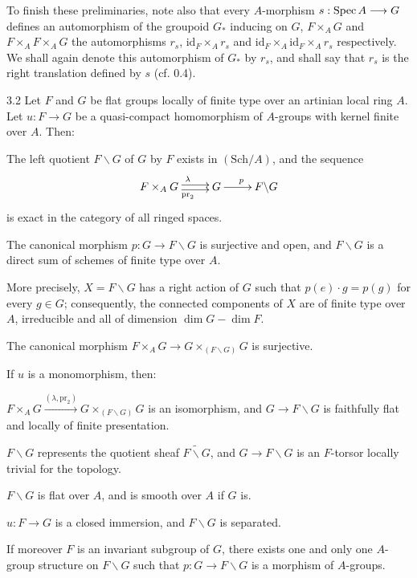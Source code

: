 To finish these preliminaries, note also that every $A$-morphism $s:\operatorname{Spec} A\longrightarrow G$ defines an automorphism of the groupoid $G_*$ inducing on $G$, $F\times_AG$ and $F\times_AF\times_AG$ the automorphisms $r_s$, $\mathrm{id}_F\times_Ar_s$ and $\mathrm{id}_F\times_A\mathrm{id}_F\times_Ar_s$ respectively. We shall again denote this automorphism of $G_*$ by $r_s$, and shall say that $r_s$ is the right translation defined by $s$ (cf. 0.4).
\begin{theorem}{3.2}\label{VIA.3.2}
Let $F$ and $G$ be flat groups locally of finite type over an artinian local ring $A$. Let $u:F\to G$ be a quasi-compact homomorphism of $A$-groups with kernel finite over $A$. Then:
\begin{enumeratei}
\item The left quotient $F\backslash G$ of $G$ by $F$ exists in $(\mathrm{Sch}/A)$, and the sequence
\[
\xymatrix{F\times_AG\ar@<.5ex>[r]^\lambda\ar@<-.5ex>[r]_{\mathrm{pr}_2}&G\ar[r]^p&F\backslash G}
\]
is exact in the category of all ringed spaces.
\item The canonical morphism $p:G\to F\backslash G$ is surjective and open, and $F\backslash G$ is a direct sum of schemes of finite type over $A$.
\item[(ii')] More precisely, $X=F\backslash G$ has a right action of $G$ such that $p(e)\cdot g=p(g)$ for every $g\in G$; consequently, the connected components of $X$ are of finite type over $A$, irreducible and all of dimension $\dim G-\dim F$.
\item The canonical morphism $F\times_AG\to G\times_{(F\backslash G)}G$ is surjective.
\item If $u$ is a monomorphism, then:
\begin{enumeratea}
\item $F\times_AG\xrightarrow{(\lambda,\mathrm{pr}_2)}G\times_{(F\backslash G)}G$ is an isomorphism, and $G\to F\backslash G$ is faithfully flat and locally of finite presentation.
\item[(a')] $F\backslash G$ represents the quotient \fppf sheaf $\widetilde{F\backslash G}$, and $G\to F\backslash G$ is an $F$-torsor locally trivial for the \fppf topology.
\item $F\backslash G$ is flat over $A$, and is smooth over $A$ if $G$ is.
\item $u:F\to G$ is a closed immersion, and $F\backslash G$ is separated.
\item If moreover $F$ is an invariant subgroup of $G$, there exists one and only one $A$-group structure on $F\backslash G$ such that $p:G\to F\backslash G$ is a morphism of $A$-groups.
\end{enumeratea}
\end{enumeratei}
\end{theorem}
